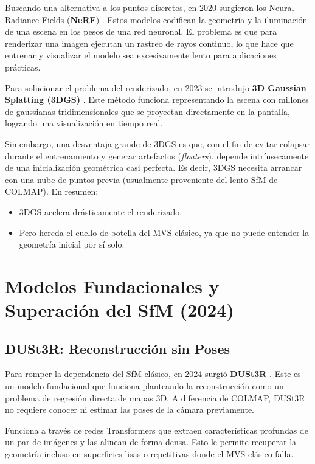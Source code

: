 Buscando una alternativa a los puntos discretos, en 2020 surgieron los Neural Radiance Fields (\textbf{NeRF}) \cite{mildenhall2020nerf}. Estos modelos codifican la geometría y la iluminación de una escena en los pesos de una red neuronal. El problema es que para renderizar una imagen ejecutan un rastreo de rayos continuo, lo que hace que entrenar y visualizar el modelo sea excesivamente lento para aplicaciones prácticas.

Para solucionar el problema del renderizado, en 2023 se introdujo \textbf{3D Gaussian Splatting (3DGS)} \cite{kerbl20233d}. Este método funciona representando la escena con millones de gaussianas tridimensionales que se proyectan directamente en la pantalla, logrando una visualización en tiempo real. 

Sin embargo, una desventaja grande de 3DGS es que, con el fin de evitar colapsar durante el entrenamiento y generar artefactos (\textit{floaters}), depende intrínsecamente de una inicialización geométrica casi perfecta. Es decir, 3DGS necesita arrancar con una nube de puntos previa (usualmente proveniente del lento SfM de COLMAP). En resumen:
\begin{itemize}
    \item 3DGS acelera drásticamente el renderizado.
    \item Pero hereda el cuello de botella del MVS clásico, ya que no puede entender la geometría inicial por sí solo.
\end{itemize}

\section{Modelos Fundacionales y Superación del SfM (2024)}

\subsection{DUSt3R: Reconstrucción sin Poses}

Para romper la dependencia del SfM clásico, en 2024 surgió \textbf{DUSt3R} \cite{wang2024dust3r}. Este es un modelo fundacional que funciona planteando la reconstrucción como un problema de regresión directa de mapas 3D. A diferencia de COLMAP, DUSt3R no requiere conocer ni estimar las poses de la cámara previamente.

Funciona a través de redes Transformers que extraen características profundas de un par de imágenes y las alinean de forma densa. Esto le permite recuperar la geometría incluso en superficies lisas o repetitivas donde el MVS clásico falla. 

